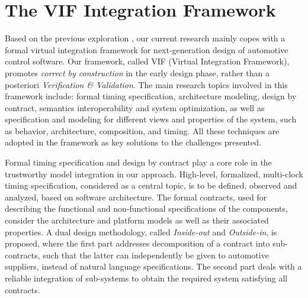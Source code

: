 %
\section{The VIF Integration Framework}


Based on the previous exploration \cite{YU:2011:INRIA-00536907:1, yu:2013-jsa}, our current research mainly copes with a formal virtual integration framework for next-generation design of automotive control software. Our framework, called VIF (Virtual Integration Framework), promotes \textit{correct by construction} in the early design phase, rather than a posteriori \textit{Verification \& Validation}.
The main research topics involved in this framework include: formal timing specification, architecture modeling, design by contract, semantics interoperability and system optimization, as well as specification and modeling for different views and properties of the system, such as behavior, architecture, composition, and timing. All these techniques are adopted in the framework as key solutions to the challenges presented.


Formal timing specification and design by contract play a core role in the trustworthy model integration in our approach. 
High-level, formalized, multi-clock timing specification, considered as a central topic, is to be defined, observed and analyzed, based on software architecture. 
The formal contracts, used for describing the functional and non-func\-tional specifications of the components, consider the  architecture and platform models as well as their associated properties. A dual design methodology, called \textit{Inside-out} and \textit{Outside-in}, is proposed, where the first part addresses decomposition of a contract into sub-contracts, such that the latter can independently be given to automotive suppliers, instead of natural language specifications. The second part deals with a reliable integration of sub-systems to obtain the required system satisfying all contracts.

